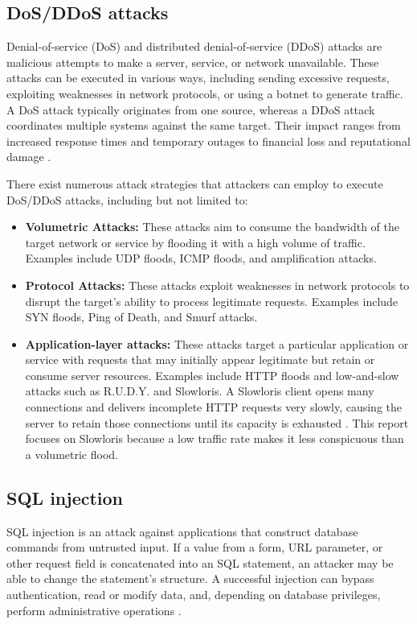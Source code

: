\subsection{DoS/DDoS attacks}
Denial-of-service (DoS) and distributed denial-of-service (DDoS) attacks are malicious attempts to make a server, service, or network unavailable. These attacks can be executed in various ways, including sending excessive requests, exploiting weaknesses in network protocols, or using a botnet to generate traffic. A DoS attack typically originates from one source, whereas a DDoS attack coordinates multiple systems against the same target. Their impact ranges from increased response times and temporary outages to financial loss and reputational damage \cite{CisaDDoS,OWASPDoS}.

There exist numerous attack strategies that attackers can  employ to execute DoS/DDoS attacks, including but not limited to:
\begin{itemize}
    \item \textbf{Volumetric Attacks:} These attacks aim to consume the bandwidth of the target network or service by flooding it with a high volume of traffic. Examples include UDP floods, ICMP floods, and amplification attacks.
    \item \textbf{Protocol Attacks:} These attacks exploit weaknesses in network protocols to disrupt the target's ability to process legitimate requests. Examples include SYN floods, Ping of Death, and Smurf attacks.
    \item \textbf{Application-layer attacks:} These attacks target a particular application or service with requests that may initially appear legitimate but retain or consume server resources. Examples include HTTP floods and low-and-slow attacks such as R.U.D.Y. and Slowloris. A Slowloris client opens many connections and delivers incomplete HTTP requests very slowly, causing the server to retain those connections until its capacity is exhausted \cite{OWASPDoS}. This report focuses on Slowloris because a low traffic rate makes it less conspicuous than a volumetric flood.
\end{itemize}
\subsection{SQL injection}
SQL injection is an attack against applications that construct database commands from untrusted input. If a value from a form, URL parameter, or other request field is concatenated into an SQL statement, an attacker may be able to change the statement's structure. A successful injection can bypass authentication, read or modify data, and, depending on database privileges, perform administrative operations \cite{OWASPSQLi}.

